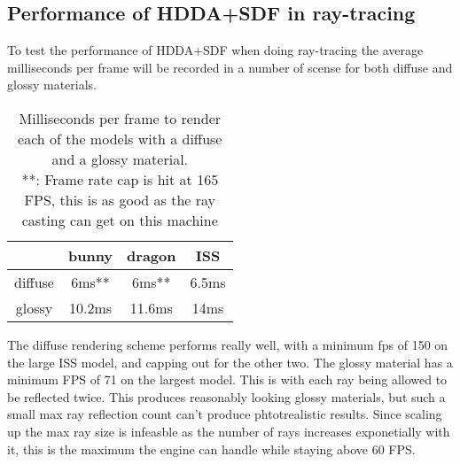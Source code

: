 \subsection{Performance of HDDA+SDF in ray-tracing}

To test the performance of HDDA+SDF when doing ray-tracing the average milliseconds per frame will be recorded in a number of scense for both diffuse and glossy materials.

\begin{table}[h]
  \centering
  \begin{tabular}{|c||c|c|c|}
    \hline
    & bunny & dragon & ISS \\
    \hline
    diffuse & 6ms** & 6ms** & 6.5ms \\
    \hline
    glossy & 10.2ms & 11.6ms & 14ms \\
    \hline
  \end{tabular}
  \caption{Milliseconds per frame to render each of the models with a diffuse and a glossy material. \\
    **: Frame rate cap is hit at 165 FPS, this is as good as the ray casting can get on this machine}
  \label{sdf_test}
\end{table}

The diffuse rendering scheme performs really well, with a minimum \acrshort{fps} of 150 on the large ISS model, and capping out for the other two. The glossy material has a minimum FPS of 71 on the largest model. This is with each ray being allowed to be reflected twice. This produces reasonably looking glossy materials, but such a small max ray reflection count can't produce phtotrealistic results. Since scaling up the max ray size is infeasble as the number of rays increases exponetially with it, this is the maximum the engine can handle while staying above 60 FPS.

